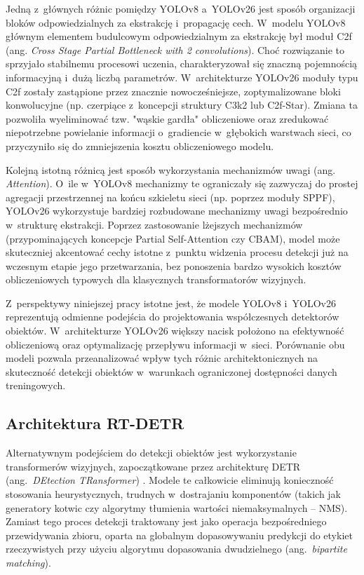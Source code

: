 Jedną z~głównych różnic pomiędzy YOLOv8 a~YOLOv26 jest sposób organizacji bloków odpowiedzialnych za ekstrakcję i~propagację cech. W~modelu YOLOv8 głównym elementem budulcowym odpowiedzialnym za ekstrakcję był moduł C2f (ang. \emph{Cross Stage Partial Bottleneck with 2 convolutions}). Choć rozwiązanie to sprzyjało stabilnemu procesowi uczenia, charakteryzował się znaczną pojemnością informacyjną i~dużą liczbą parametrów. W~architekturze YOLOv26 moduły typu C2f zostały zastąpione przez znacznie nowocześniejsze, zoptymalizowane bloki konwolucyjne (np. czerpiące z~koncepcji struktury C3k2 lub C2f-Star). Zmiana ta pozwoliła wyeliminować tzw. "wąskie gardła" obliczeniowe oraz zredukować niepotrzebne powielanie informacji o~gradiencie w~głębokich warstwach sieci, co przyczyniło się do zmniejszenia kosztu obliczeniowego modelu.

Kolejną istotną różnicą jest sposób wykorzystania mechanizmów uwagi (ang. \emph{Attention}). O~ile w~YOLOv8 mechanizmy te ograniczały się zazwyczaj do prostej agregacji przestrzennej na końcu szkieletu sieci (np. poprzez moduły SPPF), YOLOv26 wykorzystuje bardziej rozbudowane mechanizmy uwagi bezpośrednio w~strukturę ekstrakcji. Poprzez zastosowanie lżejszych mechanizmów (przypominających koncepcje Partial Self-Attention czy CBAM), model może skuteczniej akcentować cechy istotne z~punktu widzenia procesu detekcji już na wczesnym etapie jego przetwarzania, bez ponoszenia bardzo wysokich kosztów obliczeniowych typowych dla klasycznych transformatorów wizyjnych.

Z~perspektywy niniejszej pracy istotne jest, że modele YOLOv8 i~YOLOv26 reprezentują odmienne podejścia do projektowania współczesnych detektorów obiektów. W~architekturze YOLOv26 większy nacisk położono na efektywność obliczeniową oraz optymalizację przepływu informacji w~sieci. Porównanie obu modeli pozwala przeanalizować wpływ tych różnic architektonicznych na skuteczność detekcji obiektów w~warunkach ograniczonej dostępności danych treningowych.


\subsection{Architektura RT-DETR}

Alternatywnym podejściem do detekcji obiektów jest wykorzystanie transformerów wizyjnych, zapoczątkowane przez architekturę DETR (ang.\ \emph{DEtection TRansformer}) \cite{Carion2020}. Modele te całkowicie eliminują konieczność stosowania heurystycznych, trudnych w~dostrajaniu komponentów (takich jak generatory kotwic czy algorytmy tłumienia wartości niemaksymalnych -- NMS). Zamiast tego proces detekcji traktowany jest jako operacja bezpośredniego przewidywania zbioru, oparta na globalnym dopasowywaniu predykcji do etykiet rzeczywistych przy użyciu algorytmu dopasowania dwudzielnego (ang.\ \emph{bipartite matching}).

